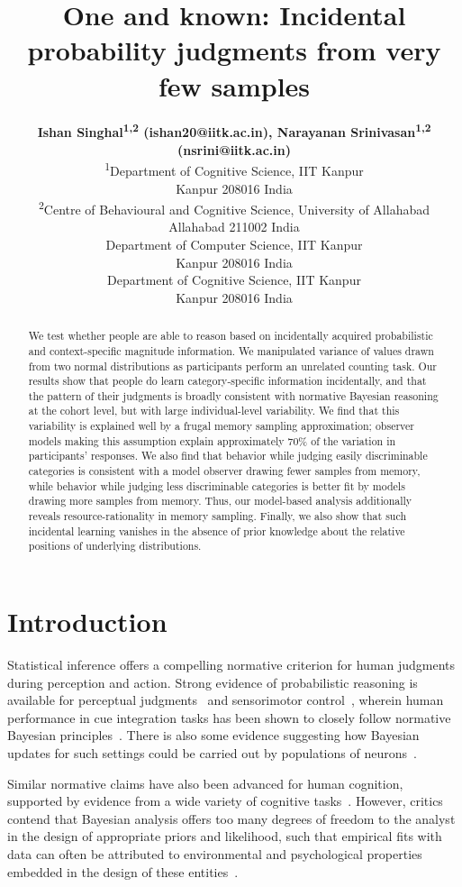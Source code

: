 \documentclass[10pt,letterpaper]{article}
\title{One and known: Incidental probability judgments from very few samples}
\author{{\large \bf Ishan Singhal\textsuperscript{1,2} (ishan20@iitk.ac.in), Narayanan Srinivasan\textsuperscript{1,2}  (nsrini@iitk.ac.in)} \\
  \textsuperscript{1}Department of Cognitive Science, IIT Kanpur \\
   Kanpur 208016 India\\
  \textsuperscript{2}Centre of Behavioural and Cognitive Science, University of Allahabad\\
  Allahabad 211002 India
  \AND {\large \bf Nisheeth Srivastava (nsrivast@iitk.ac.in)} \\
  Department of Computer Science, IIT Kanpur\\
  Kanpur 208016 India
  \AND {\large \bf Anish Thankachan (anisht21@iitk.ac.in)} \\
  Department of Cognitive Science, IIT Kanpur\\
  Kanpur 208016 India}
\begin{document}
\maketitle


\begin{abstract}
We test whether people are able to reason based on incidentally acquired probabilistic and context-specific magnitude information. We manipulated variance of values drawn from two normal distributions as participants perform an unrelated counting task. Our results show that people do learn category-specific information incidentally, and that the pattern of their judgments is broadly consistent with normative Bayesian reasoning at the cohort level, but with large individual-level variability. We find that this variability is explained well by a frugal memory sampling approximation; observer models making this assumption explain approximately 70\% of the variation in participants' responses. We also find that behavior while judging easily discriminable categories is consistent with a model observer drawing fewer samples from memory,  while behavior while judging less discriminable categories is better fit by models drawing more samples from memory. Thus, our model-based analysis additionally reveals resource-rationality in memory sampling. Finally, we also show that such incidental learning vanishes in the absence of prior knowledge about the relative positions of underlying distributions.


\end{abstract}

\section{Introduction}

Statistical inference offers a compelling normative criterion for human judgments during perception and action. Strong evidence of probabilistic reasoning is available for perceptual judgments~\cite{ernst2002humans} and sensorimotor control~\cite{kording2004bayesian}, wherein human performance in cue integration tasks has been shown to closely follow normative Bayesian principles~\cite{pouget2013probabilistic}. There is also some evidence suggesting how Bayesian updates for such settings could be carried out by populations of neurons~\cite{ma2006bayesian}.

Similar normative claims have also been advanced for human cognition, supported by evidence from a wide variety of cognitive tasks~\cite{oaksford2007bayesian, tenenbaum2011grow}.
However, critics contend that Bayesian analysis offers too many degrees of freedom to the analyst in the design of appropriate priors and likelihood, such that empirical fits with data can often be attributed to environmental and psychological properties embedded in the design of these entities~\cite{jones2011bayesian}. 
\end{document}

